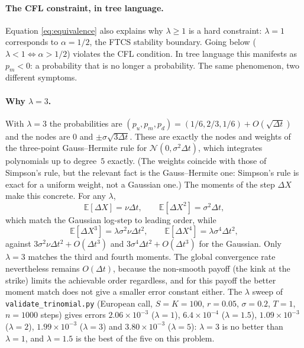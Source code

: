 \documentclass[11pt,a4paper]{article}
\begin{document}
\paragraph{The CFL constraint, in tree language.} Equation
\eqref{eq:equivalence} also explains why $\lambda \ge 1$ is a hard
constraint: $\lambda = 1$ corresponds to $\alpha = 1/2$, the FTCS
stability boundary. Going below ($\lambda < 1 \iff \alpha > 1/2$)
violates the CFL condition. In tree language this manifests as
$p_m < 0$: a probability that is no longer a probability. The same
phenomenon, two different symptoms.

\paragraph{Why $\lambda = 3$.}
With $\lambda = 3$ the probabilities are $(p_u, p_m, p_d) = (1/6, 2/3,
1/6) + O(\sqrt{\Delta t})$ and the nodes are $0$ and
$\pm\sigma\sqrt{3\Delta t}$. These are exactly the nodes and weights
of the three-point Gauss--Hermite rule for $\mathcal{N}(0, \sigma^2
\Delta t)$, which integrates polynomials up to degree~$5$ exactly. (The
weights coincide with those of Simpson's rule, but the relevant fact is
the Gauss--Hermite one: Simpson's rule is exact for a uniform weight,
not a Gaussian one.) The moments of the step $\Delta X$ make this
concrete. For any $\lambda$,
\[
\mathbb{E}[\Delta X] = \nu \Delta t, \qquad
\mathbb{E}[\Delta X^2] = \sigma^2 \Delta t,
\]
which match the Gaussian log-step to leading order, while
\[
\mathbb{E}[\Delta X^3] = \lambda \sigma^2 \nu \Delta t^2, \qquad
\mathbb{E}[\Delta X^4] = \lambda \sigma^4 \Delta t^2,
\]
against $3\sigma^2\nu\Delta t^2 + O(\Delta t^3)$ and $3\sigma^4
\Delta t^2 + O(\Delta t^3)$ for the Gaussian. Only $\lambda = 3$ matches
the third and fourth moments. The global convergence rate nevertheless
remains $O(\Delta t)$, because the non-smooth payoff (the kink at the
strike) limits the achievable order regardless, and for this payoff the
better moment match does not give a smaller error constant either. The
$\lambda$ sweep of \texttt{validate\_trinomial.py} (European call,
$S = K = 100$, $r = 0.05$, $\sigma = 0.2$, $T = 1$, $n = 1000$ steps)
gives errors $2.06\times10^{-3}$ ($\lambda = 1$), $6.4\times10^{-4}$
($\lambda = 1.5$), $1.09\times10^{-3}$ ($\lambda = 2$),
$1.99\times10^{-3}$ ($\lambda = 3$) and $3.80\times10^{-3}$
($\lambda = 5$): $\lambda = 3$ is no better than $\lambda = 1$, and
$\lambda = 1.5$ is the best of the five on this problem.

\end{document}
